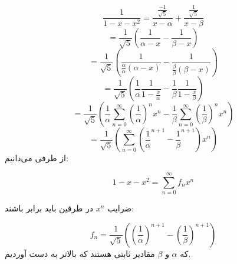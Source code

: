 \begin{PROBLEM}
{\begin{enumerate}
                        $$\frac{1}{1 - x - x^2} = \frac{\frac{-1}{\sqrt{5}}}{x - \alpha} + \frac{\frac{1}{\sqrt{5}}}{x - \beta}$$
                        $$= \frac{1}{\sqrt{5}}(\frac{1}{\alpha - x} - \frac{1}{\beta - x})$$
                        $$= \frac{1}{\sqrt{5}}(\frac{1}{ \frac{\alpha}{\alpha}(\alpha - x)} - \frac{1}{ \frac{\beta}{\beta}(\beta - x)})$$
                        $$= \frac{1}{\sqrt{5}}(\frac{1}{\alpha}\frac{1}{1 - \frac{x}{\alpha} } - \frac{1}{\beta}\frac{1}{1 - \frac{x}{\beta}})$$
                        $$= \frac{1}{\sqrt{5}}(\frac{1}{\alpha}\sum_{n = 0}^{\infty} (\frac{1}{\alpha})^nx^n - \frac{1}{\beta}\sum_{n = 0}^{\infty} (\frac{1}{\beta})^nx^n)$$
                        $$= \frac{1}{\sqrt{5}}(\sum_{n = 0}^{\infty} (\frac{1}{\alpha}^{n+1} - \frac{1}{\beta}^{n + 1})x^n)$$
                    از طرفی می‌دانیم:
                    

                    
                    $$1 - x - x^2 = \sum_{n = 0}^{\infty} f_nx^n$$
                    
                    ضرایب $x^n$ در طرفین باید برابر باشند:
                    

                    $$f_n = \frac{1}{\sqrt{5}}( (\frac{1}{\alpha})^{n + 1} - (\frac{1}{\beta})^{n + 1}   )$$
                    که 
                    $\alpha$
                    و 
                    $\beta$
                    مقادیر ثابتی هستند که بالاتر به دست آوردیم.
    \end{enumerate}

    }
\end{PROBLEM}